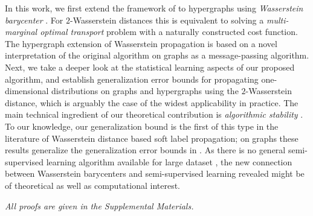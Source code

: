 \documentclass[letterpaper]{article} %
\begin{document}
In this work, we first extend the framework of \cite{Solomon:2014} to hypergraphs using \textit{Wasserstein barycenter} \cite{Wasserstein_Barycenter,Hypergraph_Asoodeh}. For $2$-Wasserstein distances this is equivalent to solving a \emph{multi-marginal optimal transport} \cite{CE2010} problem with a naturally constructed cost function. The hypergraph extension of Wasserstein propagation is based on a novel interpretation of the original algorithm on graphs \cite{Solomon:2014} as a message-passing algorithm. Next, we take a deeper look at the statistical learning aspects of our proposed algorithm, and establish generalization error bounds for propagating one-dimensional distributions on graphs and hypergraphs using the $2$-Wasserstein distance, which is arguably the case of the widest applicability in practice. The main technical ingredient of our theoretical contribution is \textit{algorithmic stability} \cite{Algorithmic_Stability}. To our knowledge, our generalization bound is the first of this type in the literature of Wasserstein distance based soft label propagation; on graphs these results generalize the generalization error bounds in \cite{Belkin2004}. As there is no general semi-supervised learning algorithm available for large dataset \cite{Label_Propa_100}, the new connection between Wasserstein barycenters and semi-supervised learning revealed might be of theoretical as well as computational interest.

\textit{All proofs are given in the Supplemental Materials.}

\end{document}

